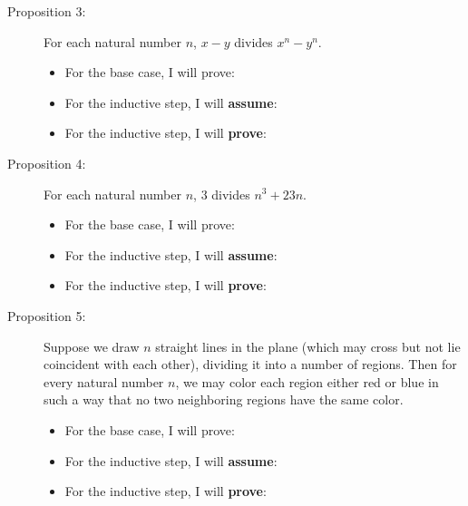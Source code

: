 \documentclass[11pt]{article}
\begin{document}
\begin{description}
		\item[Proposition 3:] For each natural number $n$, $x-y$ divides $x^n - y^n$. 
		\begin{itemize}
			\item For the base case, I will prove: 
			\vspace{0.5in}
			
			\item For the inductive step, I will \textbf{assume}: 
			\vspace{0.5in}
			\item For the inductive step, I will \textbf{prove}: 
			\vspace{0.5in}
		\end{itemize}
		
		\item[Proposition 4:] For each natural number $n$, $3$ divides $n^3 + 23n$. 
		\begin{itemize}
			\item For the base case, I will prove: 
			\vspace{0.5in}
			
			\item For the inductive step, I will \textbf{assume}: 
			\vspace{0.5in}
			\item For the inductive step, I will \textbf{prove}: 
			\vspace{0.5in}
		\end{itemize}
		
		\item[Proposition 5:] Suppose we draw $n$ straight lines in the plane (which may cross but not lie coincident with each other), dividing it into a number of regions. Then for every natural number $n$, we may color each region either red or blue in such a way that no two neighboring regions have the same color. 	
		\begin{itemize}
			\item For the base case, I will prove: 
			\vspace{0.5in}
			
			\item For the inductive step, I will \textbf{assume}: 
			\vspace{0.5in}
			\item For the inductive step, I will \textbf{prove}: 
			\vspace{0.5in}
		\end{itemize}
		
\end{description}
\end{document}
